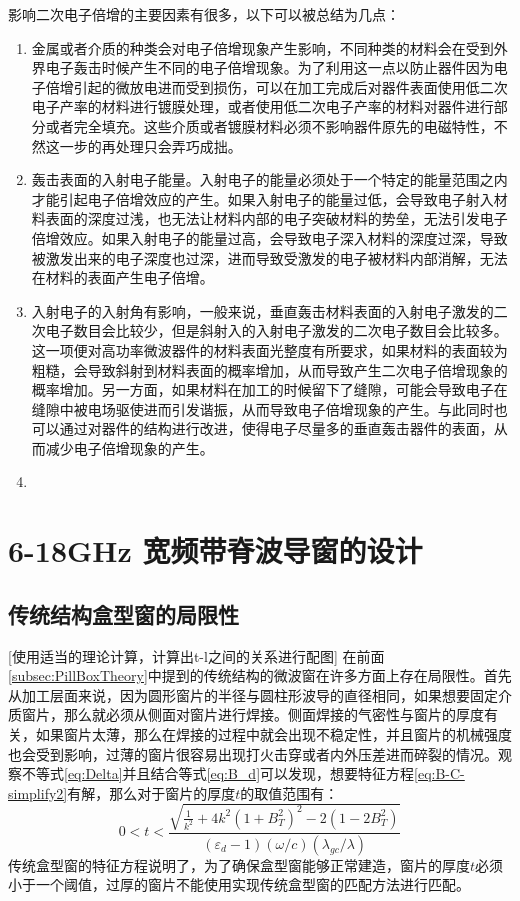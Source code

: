\documentclass[master]{thesis-uestc}
\begin{document}
影响二次电子倍增的主要因素有很多，以下可以被总结为几点：
\begin{enumerate}
    \item 金属或者介质的种类会对电子倍增现象产生影响，不同种类的材料会在受到外界电子轰击时候产生不同的电子倍增现象。为了利用这一点以防止器件因为电子倍增引起的微放电进而受到损伤，可以在加工完成后对器件表面使用低二次电子产率的材料进行镀膜处理，或者使用低二次电子产率的材料对器件进行部分或者完全填充。这些介质或者镀膜材料必须不影响器件原先的电磁特性，不然这一步的再处理只会弄巧成拙。
    \item 轰击表面的入射电子能量。入射电子的能量必须处于一个特定的能量范围之内才能引起电子倍增效应的产生。如果入射电子的能量过低，会导致电子射入材料表面的深度过浅，也无法让材料内部的电子突破材料的势垒，无法引发电子倍增效应。如果入射电子的能量过高，会导致电子深入材料的深度过深，导致被激发出来的电子深度也过深，进而导致受激发的电子被材料内部消解，无法在材料的表面产生电子倍增。
    \item 入射电子的入射角有影响，一般来说，垂直轰击材料表面的入射电子激发的二次电子数目会比较少，但是斜射入的入射电子激发的二次电子数目会比较多。这一项便对高功率微波器件的材料表面光整度有所要求，如果材料的表面较为粗糙，会导致斜射到材料表面的概率增加，从而导致产生二次电子倍增现象的概率增加。另一方面，如果材料在加工的时候留下了缝隙，可能会导致电子在缝隙中被电场驱使进而引发谐振，从而导致电子倍增现象的产生。与此同时也可以通过对器件的结构进行改进，使得电子尽量多的垂直轰击器件的表面，从而减少电子倍增现象的产生。
    \item 
\end{enumerate}
\chapter{6-18GHz 宽频带脊波导窗的设计}
\section{传统结构盒型窗的局限性}
[使用适当的理论计算，计算出t-l之间的关系进行配图]
在前面\ref{subsec:PillBoxTheory}中提到的传统结构的微波窗在许多方面上存在局限性。首先从加工层面来说，因为圆形窗片的半径与圆柱形波导的直径相同，如果想要固定介质窗片，那么就必须从侧面对窗片进行焊接。侧面焊接的气密性与窗片的厚度有关，如果窗片太薄，那么在焊接的过程中就会出现不稳定性，并且窗片的机械强度也会受到影响，过薄的窗片很容易出现打火击穿或者内外压差进而碎裂的情况。观察不等式\ref{eq:Delta}并且结合等式\ref{eq:B_d}可以发现，想要特征方程\ref{eq:B-C-simplify2}有解，那么对于窗片的厚度$t$的取值范围有：
\begin{equation}\label{eq:t_constraints}
    0 < t < \frac{\sqrt{\frac{1}{k^2}+4k^2(1+B_{T}^2)^2-2(1-2B_{T}^2)}}{(\varepsilon_{d}-1)(\omega / c)(\lambda_{gc} / \lambda)}
\end{equation}
传统盒型窗的特征方程说明了，为了确保盒型窗能够正常建造，窗片的厚度$t$必须小于一个阈值，过厚的窗片不能使用实现传统盒型窗的匹配方法进行匹配。
\end{document}
